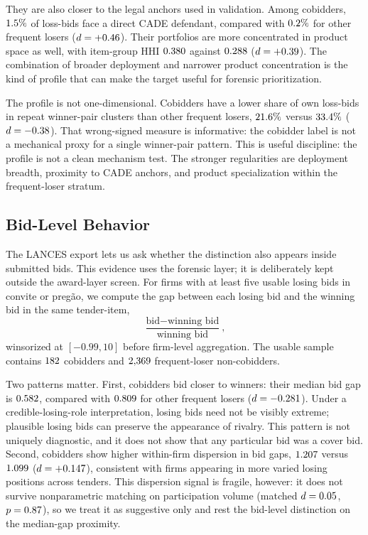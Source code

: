 They are also closer to the legal anchors used in validation.
Among cobidders, $1.5\%$ of loss-bids face a direct
CADE defendant, compared with $0.2\%$ for other
frequent losers ($d=+0.46$). Their portfolios are
more concentrated in product space as well, with item-group HHI
$0.380$ against $0.288$
($d=+0.39$). The combination of broader deployment and
narrower product concentration is the kind of profile that can
make the target useful for forensic prioritization.

The profile is not one-dimensional. Cobidders have a lower share
of own loss-bids in repeat winner-pair clusters than other
frequent losers, $21.6\%$ versus
$33.4\%$ ($d=-0.38$). That
wrong-signed measure is informative: the cobidder label is not a
mechanical proxy for a single winner-pair pattern. This is useful
discipline: the profile is not a clean mechanism test. The stronger
regularities are deployment breadth, proximity to CADE anchors,
and product specialization within the frequent-loser stratum.

\subsection{Bid-Level Behavior}
\label{sec:cobidder_bid}

The LANCES export lets us ask whether the distinction also
appears inside submitted bids. This evidence uses the forensic
layer; it is deliberately kept outside the award-layer screen.
For firms with at least five usable losing bids in convite or
preg\~ao, we compute the gap between each losing bid and the
winning bid in the same tender-item,
\[
  \frac{\text{bid}-\text{winning bid}}{\text{winning bid}},
\]
winsorized at $[-0.99,10]$ before firm-level aggregation. The
usable sample contains $182$ cobidders and
$2{,}369$ frequent-loser non-cobidders.

Two patterns matter. First, cobidders bid closer to winners:
their median bid gap is $0.582$, compared with
$0.809$ for other frequent losers
($d=-0.281$). Under a credible-losing-role
interpretation, losing bids need not be visibly extreme;
plausible losing bids can preserve the appearance of rivalry.
This pattern is not uniquely diagnostic, and it does not show
that any particular bid was a cover bid. Second, cobidders show
higher within-firm dispersion in bid gaps,
$1.207$ versus $1.099$
($d=+0.147$), consistent with firms appearing in more
varied losing positions across tenders.
This dispersion signal is fragile, however: it does not survive
nonparametric matching on participation volume (matched
$d=0.05$, $p=0.87$), so we treat it as
suggestive only and rest the bid-level distinction on the
median-gap proximity.


